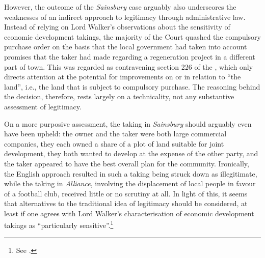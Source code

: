 However, the outcome of the {\it Sainsbury} case arguably also underscores the weaknesses of an indirect approach to legitimacy through administrative law. Instead of relying on Lord Walker's observations about the sensitivity of economic development takings, the majority of the Court quashed the compulsory purchase order on the basis that the local government had taken into account promises that the taker had made regarding a regeneration project in a different part of town. This was regarded as contravening section 226 of the \cite{tcpa90}, which only directs attention at the potential for improvements on or in relation to ``the land'', i.e., the land that is subject to compulsory purchase. The reasoning behind the decision, therefore, rests largely on a technicality, not any substantive assessment of legitimacy.

On a more purposive assessment, the taking in {\it Sainsbury} should arguably even have been upheld: the owner and the taker were both large commercial companies, they each owned a share of a plot of land suitable for joint development, they both wanted to develop at the expense of the other party, and the taker appeared to have the best overall plan for the community. Ironically, the English approach resulted in such a taking being struck down as illegitimate, while the taking in {\it Alliance}, involving the displacement of local people in favour of a football club, received little or no scrutiny at all. In light of this, it seems that alternatives to the traditional idea of legitimacy should be considered, at least if one agrees with Lord Walker's characterisation of economic development takings as ``particularly sensitive''.\footnote{See \cite[82]{sainsbury10}.}

